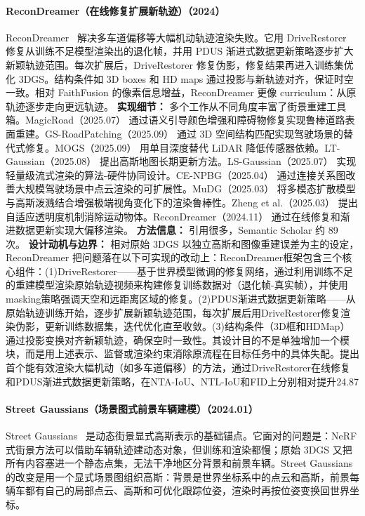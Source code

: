 \paragraph{ReconDreamer（在线修复扩展新轨迹）（2024）}
ReconDreamer~\cite{2411_19548} 解决多车道偏移等大幅机动轨迹渲染失败。它用 DriveRestorer 修复从训练不足模型渲染出的退化帧，并用 PDUS 渐进式数据更新策略逐步扩大新颖轨迹范围。每次扩展后，DriveRestorer 修复伪影，修复结果再进入训练集优化 3DGS。结构条件如 3D boxes 和 HD maps 通过投影与新轨迹对齐，保证时空一致。相对 FaithFusion 的像素信息增益，ReconDreamer 更像 curriculum：从原轨迹逐步走向更远轨迹。
\textbf{实现细节：} 多个工作从不同角度丰富了街景重建工具箱。MagicRoad（2025.07） 通过语义引导颜色增强和障碍物修复实现鲁棒道路表面重建。GS-RoadPatching（2025.09） 通过 3D 空间结构匹配实现驾驶场景的替代式修复。MOGS（2025.09） 用单目深度替代 LiDAR 降低传感器依赖。LT-Gaussian（2025.08） 提出高斯地图长期更新方法。LS-Gaussian（2025.07） 实现轻量级流式渲染的算法-硬件协同设计。CE-NPBG（2025.04） 通过连接关系图改善大规模驾驶场景中点云渲染的可扩展性。MuDG（2025.03） 将多模态扩散模型与高斯泼溅结合增强极端视角变化下的渲染鲁棒性。Zheng et al.（2025.03） 提出自适应透明度机制消除运动物体。ReconDreamer（2024.11） 通过在线修复和渐进数据更新实现大偏移渲染。
\textbf{方法信息：} 引用很多，Semantic Scholar 约 89 次。
\textbf{设计动机与边界：} 相对原始 3DGS 以独立高斯和图像重建误差为主的设定，ReconDreamer 把问题落在以下可实现的改动上：ReconDreamer框架包含三个核心组件：(1)DriveRestorer——基于世界模型微调的修复网络，通过利用训练不足的重建模型渲染原始轨迹视频来构建修复训练数据对（退化帧-真实帧），并使用masking策略强调天空和远距离区域的修复。(2)PDUS渐进式数据更新策略——从原始轨迹训练开始，逐步扩展新颖轨迹范围，每次扩展后用DriveRestorer修复渲染伪影，更新训练数据集，迭代优化直至收敛。(3)结构条件（3D框和HDMap）通过投影变换对齐新颖轨迹，确保空时一致性。其设计目的不是单独增加一个模块，而是用上述表示、监督或渲染约束消除原流程在目标任务中的具体失配。提出首个能有效渲染大幅机动（如多车道偏移）的方法，通过DriveRestorer在线修复和PDUS渐进式数据更新策略，在NTA-IoU、NTL-IoU和FID上分别相对提升24.87%
\paragraph{Street Gaussians（场景图式前景车辆建模）（2024.01）}
Street Gaussians~\cite{2401_01339} 是动态街景显式高斯表示的基础锚点。它面对的问题是：NeRF 式街景方法可以借助车辆轨迹建动态对象，但训练和渲染都慢；原始 3DGS 又把所有内容塞进一个静态点集，无法干净地区分背景和前景车辆。Street Gaussians 的改变是用一个显式场景图组织高斯：背景是世界坐标系中的点云和高斯，前景每辆车都有自己的局部点云、高斯和可优化跟踪位姿，渲染时再按位姿变换回世界坐标。

